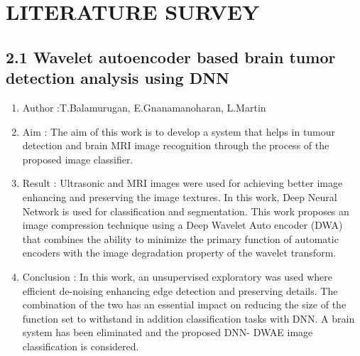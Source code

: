 \documentclass[oneside,a4paper,12pt]{book}
\begin{document}
\vspace{\baselineskip}

\vspace{\baselineskip}

\vspace{\baselineskip}

\vspace{\baselineskip}

\vspace{\baselineskip}

\vspace{\baselineskip}

\vspace{\baselineskip}
\chapter{LITERATURE SURVEY}\par



\newpage
\vspace{\baselineskip}\section*{2.1\hspace*{10pt} Wavelet autoencoder based brain tumor detection analysis using DNN
}
\begin{enumerate}

\item Author :T.Balamurugan, E.Gnanamanoharan, L.Martin     

\item Aim : The aim of this work is to develop a system that helps in tumour detection and brain MRI image recognition through the process of the proposed image classifier. 
\item Result : Ultrasonic and MRI images were used for achieving better image enhancing and preserving the image textures.
In this work, Deep Neural Network is used for classification and segmentation. This work proposes an image compression technique using a Deep Wavelet Auto encoder (DWA) that combines the ability to minimize the primary function of automatic encoders with the image degradation property of the wavelet transform.


\item Conclusion : In this work, an unsupervised exploratory was used where efficient de-noising enhancing edge detection and preserving details.
The combination of the two has an essential impact on reducing the size of the function set to withstand in addition classification tasks with DNN. A brain system has been eliminated and the proposed DNN- DWAE image classification is considered.


\end{enumerate}\par
\end{document}
